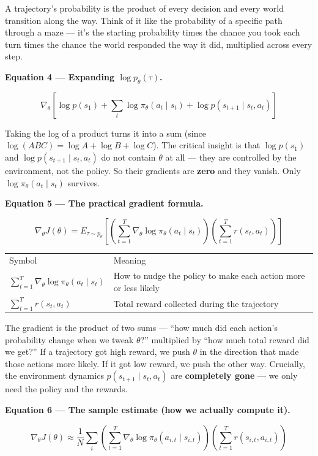 \medskip
A trajectory's probability is the product of every decision and every world transition along
the way. Think of it like the probability of a specific path through a maze --- it's the
starting probability times the chance you took each turn times the chance the world responded
the way it did, multiplied across every step.

\medskip
\textbf{Equation 4 --- Expanding $\log p_\theta(\tau)$.}

\[
  \nabla_\theta\!\left[
    \log p(s_1)
    + \sum_t \log\pi_\theta(a_t\mid s_t)
    + \log p(s_{t+1}\mid s_t,a_t)
  \right]
\]

Taking the log of a product turns it into a sum (since $\log(ABC)=\log A+\log B+\log C$).
The critical insight is that $\log p(s_1)$ and $\log p(s_{t+1}\mid s_t,a_t)$ do not contain
$\theta$ at all --- they are controlled by the environment, not the policy. So their gradients
are \textbf{zero} and they vanish. Only $\log\pi_\theta(a_t\mid s_t)$ survives.

\medskip
\textbf{Equation 5 --- The practical gradient formula.}

\[
  \nabla_\theta J(\theta)
  = E_{\tau\sim p_\theta}\!\left[
      \left(\sum_{t=1}^T \nabla_\theta\log\pi_\theta(a_t\mid s_t)\right)
      \left(\sum_{t=1}^T r(s_t,a_t)\right)
    \right]
\]

\begin{tabular}{ll}
  Symbol & Meaning \\[4pt]
  $\sum_{t=1}^T\nabla_\theta\log\pi_\theta(a_t\mid s_t)$ & How to nudge the policy to make each action more or less likely \\
  $\sum_{t=1}^T r(s_t,a_t)$ & Total reward collected during the trajectory \\
\end{tabular}

\medskip
The gradient is the product of two sums --- ``how much did each action's probability change
when we tweak $\theta$?'' multiplied by ``how much total reward did we get?'' If a trajectory
got high reward, we push $\theta$ in the direction that made those actions more likely. If it
got low reward, we push the other way. Crucially, the environment dynamics
$p(s_{t+1}\mid s_t,a_t)$ are \textbf{completely gone} --- we only need the policy and
the rewards.

\medskip
\textbf{Equation 6 --- The sample estimate (how we actually compute it).}

\[
  \nabla_\theta J(\theta)
  \approx \frac{1}{N}\sum_i
    \left(\sum_{t=1}^T\nabla_\theta\log\pi_\theta(a_{i,t}\mid s_{i,t})\right)
    \left(\sum_{t=1}^T r(s_{i,t},a_{i,t})\right)
\]


